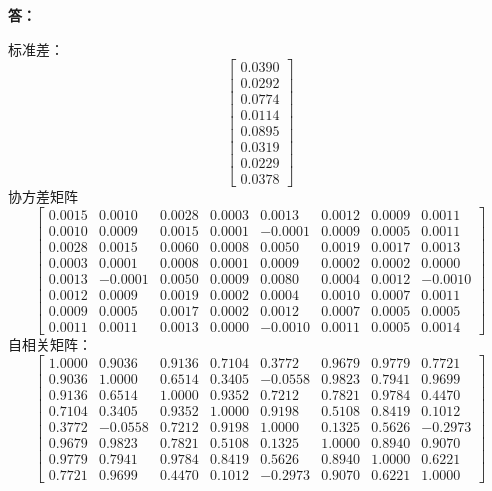 \documentclass[12pt, a4paper, oneside]{article}
\newcounter{answername}
\newenvironment{answer}{\stepcounter{answername}\par\noindent\textbf{答：}}{\par}
\begin{document}
\begin{CJK*}{UTF8}{gbsn}
\begin{answer}
\begin{enumerate}
			标准差：
			$$\left[\begin{array}{c}0.0390 \\ 0.0292 \\ 0.0774 \\ 0.0114 \\ 0.0895 \\ 0.0319 \\ 0.0229 \\ 0.0378\end{array}\right]$$
			协方差矩阵
			$$\left[\begin{array}{cccccccc}0.0015 & 0.0010 & 0.0028 & 0.0003 & 0.0013 & 0.0012 & 0.0009 & 0.0011 \\0.0010 & 0.0009 & 0.0015 & 0.0001 & -0.0001 & 0.0009 & 0.0005 & 0.0011 \\0.0028 & 0.0015 & 0.0060 & 0.0008 & 0.0050 & 0.0019 & 0.0017 & 0.0013 \\0.0003 & 0.0001 & 0.0008 & 0.0001 & 0.0009 & 0.0002 & 0.0002 & 0.0000 \\0.0013 & -0.0001 & 0.0050 & 0.0009 & 0.0080 & 0.0004 & 0.0012 & -0.0010 \\0.0012 & 0.0009 & 0.0019 & 0.0002 & 0.0004 & 0.0010 & 0.0007 & 0.0011 \\0.0009 & 0.0005 & 0.0017 & 0.0002 & 0.0012 & 0.0007 & 0.0005 & 0.0005 \\0.0011 & 0.0011 & 0.0013 & 0.0000 & -0.0010 & 0.0011 & 0.0005 & 0.0014 \end{array}\right]$$
			自相关矩阵：
			$$\left[\begin{array}{cccccccc}1.0000 & 0.9036 & 0.9136 & 0.7104 & 0.3772 & 0.9679 & 0.9779 & 0.7721 \\0.9036 & 1.0000 & 0.6514 & 0.3405 & -0.0558 & 0.9823 & 0.7941 & 0.9699 \\0.9136 & 0.6514 & 1.0000 & 0.9352 & 0.7212 & 0.7821 & 0.9784 & 0.4470 \\0.7104 & 0.3405 & 0.9352 & 1.0000 & 0.9198 & 0.5108 & 0.8419 & 0.1012 \\0.3772 & -0.0558 & 0.7212 & 0.9198 & 1.0000 & 0.1325 & 0.5626 & -0.2973 \\0.9679 & 0.9823 & 0.7821 & 0.5108 & 0.1325 & 1.0000 & 0.8940 & 0.9070 \\0.9779 & 0.7941 & 0.9784 & 0.8419 & 0.5626 & 0.8940 & 1.0000 & 0.6221 \\0.7721 & 0.9699 & 0.4470 & 0.1012 & -0.2973 & 0.9070 & 0.6221 & 1.0000 \end{array}\right]$$
	\end{enumerate}
\end{answer}


\end{CJK*}
\end{document}
